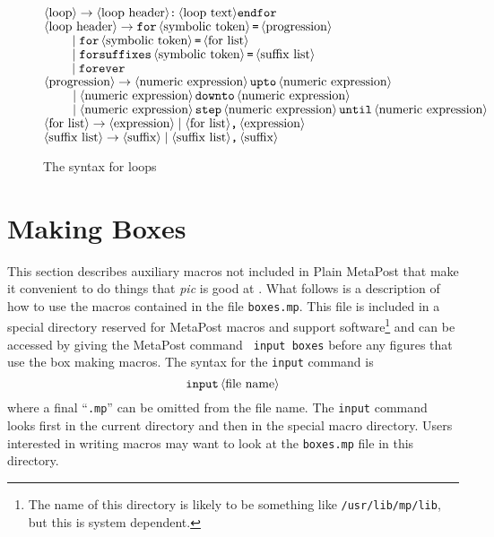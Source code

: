 \documentclass{article} %
\newcommand\descr[1]{{\langle\hbox{#1}\rangle}}
\begin{document}
\begin{figure}[htp]
\begin{ctabbing}
$\tt \descr{loop} \rightarrow \descr{loop header}\hbox{\tt :}\,
        \descr{loop text} endfor$\\
$\tt \descr{loop header} \rightarrow for\, \descr{symbolic token}\,
        \hbox{\tt =}\, \descr{progression}$\\
$\tt \qquad \;|\; for\, \descr{symbolic token}\, \hbox{\tt =}\,
        \descr{for list}$\\
$\tt \qquad \;|\; forsuffixes\, \descr{symbolic token}\, \hbox{\tt =}\,
        \descr{suffix list}$\\
$\tt \qquad \;|\; forever$\\
$\tt \descr{progression} \rightarrow \descr{numeric expression}\, upto\,
        \descr{numeric expression}$\\
$\tt \qquad \;|\; \descr{numeric expression}\, downto\,
        \descr{numeric expression}$\\
$\tt \qquad \;|\; \descr{numeric expression}\, step\,
        \descr{numeric expression}\, until\, \descr{numeric expression} $\\
$\tt \descr{for list} \rightarrow \descr{expression}
        \;|\; \descr{for list}\hbox{\tt ,}\, \descr{expression}$\\
$\tt \descr{suffix list} \rightarrow \descr{suffix}
        \;|\; \descr{suffix list}\hbox{\tt ,}\, \descr{suffix}$
\end{ctabbing}
\caption{The syntax for loops}
\label{syloop}
\end{figure}


\section{Making Boxes}
\label{boxessec}

This section describes auxiliary macros not included in Plain MetaPost
that make it convenient to do things that {\it pic} is good at
\cite{ke:pic}.  What follows is a description of how to use the macros
contained in the file {\tt boxes.mp}.
This file is included in a special directory reserved for MetaPost
macros and support software\footnote{The name of this directory is
likely to be something like \verb|/usr/lib/mp/lib|, but this is system
dependent.}  and can be accessed by giving the MetaPost command {\tt
input boxes} before any figures that use the box making macros.  The
syntax for the {\tt input} command is 
$$ {\tt input}\, \descr{file name} $$
where a final ``{\tt .mp}'' can be omitted from the file name.  The {\tt input}
command looks first in the current directory and then in the special macro
directory.  Users interested in writing macros may want to look at the
{\tt boxes.mp} file in this directory.
\end{document}
